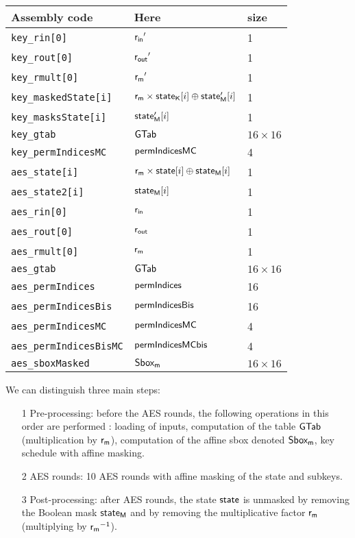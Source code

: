 \begin{center}

\begin{tabular}{lll}
	  Assembly code & Here & size \\ \hline
\texttt{key\_rin[0]} 		& $\mathsf{r_{in}}'$ 		& 1\\
 \texttt{key\_rout[0]} 		& $\mathsf{r_{out}} '$ 	&1\\
\texttt{key\_rmult[0]} 		& $\mathsf{r_m} ' $	&1\\
 \texttt{key\_maskedState[i]} 	& $ \mathsf{r_m} \times \mathsf{state_K}[i] \oplus \mathsf{state'_{M}}[i] $ & 1\\
 \texttt{key\_masksState[i]} 	& $ \mathsf{state'_{M}}[i]$ & 1\\
\texttt{key\_gtab} 			& $\mathsf{GTab}$  	&$ 16 \times 16$ \\
\texttt{key\_permIndicesMC} &$\mathsf{permIndicesMC}$ & 4\\
\hline
 \texttt{aes\_state[i]} & $\mathsf{r_m} \times \mathsf{state}[i] \oplus \mathsf{state_M}[i] $ & 1\\
 \texttt{aes\_state2[i]} & $\mathsf{state_M}[i]$  & 1\\
\texttt{aes\_rin[0]} & $\mathsf{r_{in}}$ &1\\
\texttt{aes\_rout[0]} & $\mathsf{r_{out}}$ &1\\
\texttt{aes\_rmult[0]} & $\mathsf{r_m}$ &1\\
 \texttt{aes\_gtab} &  $\mathsf{GTab}$  &$ 16 \times 16$\\
 \texttt{aes\_permIndices} & $\mathsf{permIndices}$& 16\\
\texttt{aes\_permIndicesBis} & $\mathsf{permIndicesBis}$ & 16\\
\texttt{aes\_permIndicesMC} & $\mathsf{permIndicesMC}$  & 4 \\
 \texttt{aes\_permIndicesBisMC} & $\mathsf{permIndicesMCbis}$  &4 \\
 \texttt{aes\_sboxMasked} & $\mathsf{Sbox_m}$ & $16 \times 16$ \\
\hline
\end{tabular}
\label{tab:notations}
\end{center}


\noindent We can distinguish three main steps: 
\begin{itemize}

	\item[1] Pre-processing: before the AES rounds, the following operations in this order are performed : loading of inputs, computation of the table $\mathsf{GTab}$ (multiplication by $\mathsf{r_m}$), computation of the affine sbox denoted $\mathsf{Sbox_m}$, key schedule with affine masking.  
	
	\item[2] AES rounds: 10 AES rounds with affine masking of the state and subkeys.
	
	\item[3] Post-processing: after AES rounds, the state $\mathsf{state}$ is unmasked by removing the Boolean mask $\mathsf{state_M}$ and by removing the multiplicative factor $\mathsf{r_m}$ (multiplying by $\mathsf{r_m}^{-1}$).
\end{itemize}


